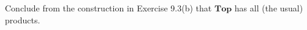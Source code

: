 Conclude from the construction in Exercise 9.3(b) that $\mathbf{Top}$ has all (the usual) products.
